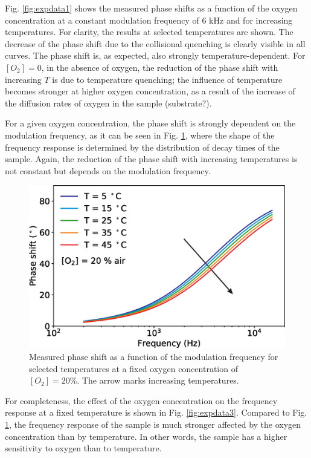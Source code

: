 \documentclass[9pt,twocolumn,twoside,pdftex]{optica}
\begin{document}
Fig. \ref{fig:expdata1} shows the measured phase shifts as a function of the oxygen concentration at a constant modulation frequency of 6 kHz and for increasing temperatures. For clarity, the results at selected temperatures are shown. The decrease of the phase shift due to the collisional quenching is clearly visible in all curves. The phase shift is, as expected, also strongly  temperature-dependent. For $[O_2]=0$, in the absence of oxygen, the reduction of the phase shift with increasing $T$ is due to temperature quenching; the influence of temperature becomes stronger at higher oxygen concentration, as a result of the increase of the diffusion rates of oxygen in the sample (substrate?).

For a given oxygen concentration, the phase shift is strongly dependent on the modulation frequency, as it can be seen in Fig. \ref{fig:expdata2}, where the shape of the frequency response is determined by the distribution of decay times of the sample. Again, the reduction of the phase shift with increasing temperatures is not constant but depends on the modulation frequency.

\begin{figure}[t!]
\centering
\includegraphics[width=8.2 cm]{phase_f_T.eps}
\caption{Measured phase shift as a function of the modulation frequency for selected temperatures at a fixed oxygen concentration of $[O_2]=20 \%$. The arrow marks increasing temperatures.}
\label{fig:expdata2}
\end{figure}

For completeness, the effect of the oxygen concentration on the frequency response at a fixed temperature is shown in Fig. \ref{fig:expdata3}. Compared to Fig. \ref{fig:expdata2}, the frequency response of the sample is much stronger affected by the oxygen concentration than by temperature. In other words, the sample has a higher sensitivity to oxygen than to temperature.
\end{document}
